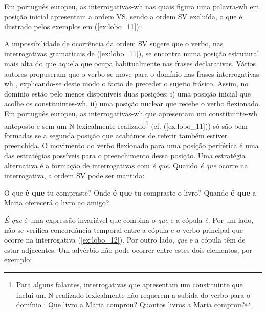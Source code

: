 \documentclass[output=paper]{LSP/langsci}
\begin{document}
Em português europeu, as interrogativas-wh nas quais figura uma palavra-wh em posição inicial apresentam a ordem VS, sendo a ordem SV excluída, o que é ilustrado pelos exemplos em (\ref{ex:lobo_11}):

\ea\label{ex:lobo_11}
\zl

A impossibilidade de ocorrência da ordem SV sugere que o verbo, nas interrogativas gramaticais de (\ref{ex:lobo_11}), se encontra numa posição estrutural mais alta do que aquela que ocupa habitualmente nas frases declarativas. Vários autores propuseram que o verbo se move para o domínio  nas frases interrogativas-wh \citep{brito1982,rouveret1992,ambar1988,soares2006}, explicando-se deste modo o facto de preceder o sujeito frásico. Assim, no domínio  estão pelo menos disponíveis duas posições: i) uma posição inicial que acolhe os constituintes-wh, ii) uma posição nuclear que recebe o verbo flexionado. Em português europeu, as interrogativas-wh que apresentam um constituinte-wh anteposto e sem um N lexicalmente realizado\footnote{
Para alguns falantes, interrogativas que apresentam um constituinte que inclui um N realizado lexicalmente não requerem a subida do verbo para o domínio  \citep{ambar2003,mateus_etal2003}:
\ea\label{ex:lobo_i}
\ea\label{ex:lobo_ia} Que livro a Maria comprou?
\ex\label{ex:lobo_ib} Quantos livros a Maria comprou?
\zl} (cf. (\ref{ex:lobo_11})) só são bem formadas se a segunda posição que acabámos de referir também estiver preenchida. O movimento do verbo flexionado para uma posição periférica é uma das estratégias possíveis para o preenchimento dessa posição. Uma estratégia alternativa é a formação de interrogativas com \textit{é que}. Quando \textit{é que} ocorre na interrogativa, a ordem SV pode ser mantida:

\ea\label{ex:lobo_12}
\ea\label{ex:lobo_12a} O que \textbf{é que} tu compraste?
\ex\label{ex:lobo_12b} Onde \textbf{é que} tu compraste o livro?
\ex\label{ex:lobo_12c} Quando \textbf{é que} a Maria oferecerá o livro ao amigo?
\zl

\textit{É que} é uma expressão invariável que combina o  \textit{que} e a cópula \textit{é}. Por um lado, não se verifica concordância temporal entre a cópula e o verbo principal que ocorre na interrogativa (\ref{ex:lobo_12}). Por outro lado, \textit{que} e a cópula têm de estar adjacentes. Um advérbio não pode ocorrer entre estes dois elementos, por exemplo:
\end{document}
